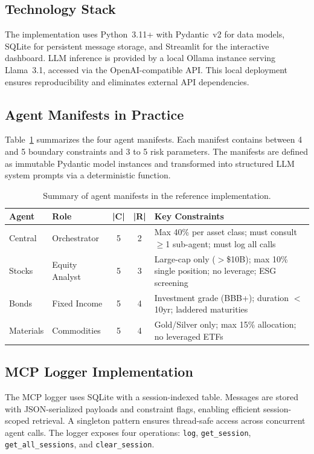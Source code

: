\documentclass[runningheads]{llncs}
\begin{document}
\subsection{Technology Stack}

The implementation uses Python~3.11+ with Pydantic~v2 for data models, SQLite for persistent message storage, and Streamlit for the interactive dashboard. LLM inference is provided by a local Ollama instance serving Llama~3.1, accessed via the OpenAI-compatible API. This local deployment ensures reproducibility and eliminates external API dependencies.

\subsection{Agent Manifests in Practice}

Table~\ref{tab:manifests} summarizes the four agent manifests. Each manifest contains between 4 and 5 boundary constraints and 3 to 5 risk parameters. The manifests are defined as immutable Pydantic model instances and transformed into structured LLM system prompts via a deterministic function.

\begin{table}[t]
\centering
\caption{Summary of agent manifests in the reference implementation.}
\label{tab:manifests}
\begin{tabular}{@{}llccp{4.8cm}@{}}
\toprule
\textbf{Agent} & \textbf{Role} & \textbf{|C|} & \textbf{|R|} & \textbf{Key Constraints} \\
\midrule
Central & Orchestrator & 5 & 2 & Max 40\% per asset class; must consult $\geq$1 sub-agent; must log all calls \\
Stocks & Equity Analyst & 5 & 3 & Large-cap only ($>$\$10B); max 10\% single position; no leverage; ESG screening \\
Bonds & Fixed Income & 5 & 4 & Investment grade (BBB+); duration $<$10yr; laddered maturities \\
Materials & Commodities & 5 & 4 & Gold/Silver only; max 15\% allocation; no leveraged ETFs \\
\bottomrule
\end{tabular}
\end{table}

\subsection{MCP Logger Implementation}

The MCP logger uses SQLite with a session-indexed table. Messages are stored with JSON-serialized payloads and constraint flags, enabling efficient session-scoped retrieval. A singleton pattern ensures thread-safe access across concurrent agent calls. The logger exposes four operations: \texttt{log}, \texttt{get\_session}, \texttt{get\_all\_sessions}, and \texttt{clear\_session}.
\end{document}
